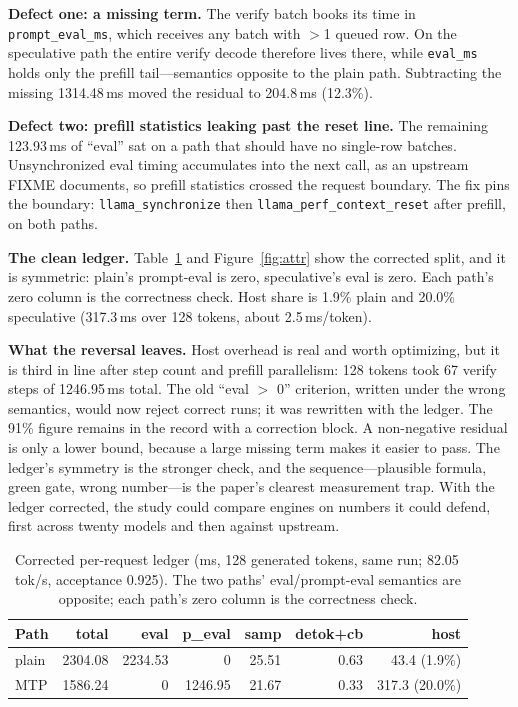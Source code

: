 \documentclass[letterpaper,twocolumn,10pt]{article}
\begin{document}
\textbf{Defect one: a missing term.} The verify batch books its time in
\texttt{prompt\_eval\_ms}, which receives any batch with $>$1 queued row. On
the speculative path the entire verify decode therefore lives there, while
\texttt{eval\_ms} holds only the prefill tail---semantics opposite to the
plain path. Subtracting the missing 1314.48\,ms moved the residual to
204.8\,ms (12.3\%).

\textbf{Defect two: prefill statistics leaking past the reset line.} The
remaining 123.93\,ms of ``eval'' sat on a path that should have no single-row
batches. Unsynchronized eval timing accumulates into the next call, as an
upstream FIXME documents, so prefill statistics crossed the request boundary.
The fix pins the boundary: \texttt{llama\_synchronize} then
\texttt{llama\_perf\_context\_reset} after prefill, on both paths.

\textbf{The clean ledger.} Table~\ref{tab:attr} and Figure~\ref{fig:attr} show
the corrected split, and it is symmetric: plain's prompt-eval is zero,
speculative's eval is zero. Each path's zero column is the correctness check.
Host share is 1.9\% plain and 20.0\% speculative (317.3\,ms over 128 tokens,
about 2.5\,ms/token).

\textbf{What the reversal leaves.} Host overhead is real and worth optimizing,
but it is third in line after step count and prefill parallelism: 128 tokens
took 67 verify steps of 1246.95\,ms total. The old ``eval $>$ 0'' criterion,
written under the wrong semantics, would now reject correct runs; it was
rewritten with the ledger. The 91\% figure remains in the record with a
correction block. A non-negative residual is only a lower bound, because a
large missing term makes it easier to pass. The ledger's symmetry is the
stronger check, and the sequence---plausible formula, green gate, wrong
number---is the paper's clearest measurement trap. With the ledger corrected,
the study could compare engines on numbers it could defend, first across
twenty models and then against upstream.

\begin{table}[t]
\centering
\small
\setlength{\tabcolsep}{2.2pt}
\begin{tabular}{@{}lrrrrrr@{}}
\toprule
Path & total & eval & p\_eval & samp & detok+cb & host \\
\midrule
plain & 2304.08 & 2234.53 & 0 & 25.51 & 0.63 & 43.4 (1.9\%) \\
MTP & 1586.24 & 0 & 1246.95 & 21.67 & 0.33 & 317.3 (20.0\%) \\
\bottomrule
\end{tabular}
\caption{Corrected per-request ledger (ms, 128 generated tokens, same run;
82.05\,tok/s, acceptance 0.925). The two paths' eval/prompt-eval semantics are
opposite; each path's zero column is the correctness check.}
\label{tab:attr}
\end{table}
\end{document}
